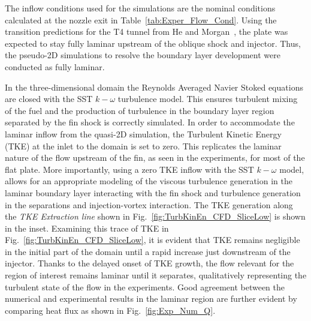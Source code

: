 \documentclass{AIAA}
\begin{document}
The inflow conditions used for the simulations are the nominal conditions calculated at the nozzle exit in Table~\ref{tab:Exper_Flow_Cond}.
Using the transition predictions for the T4 tunnel from He and Morgan~\cite{He_Morgan}, the plate was expected to stay fully laminar upstream of the oblique shock and injector.
Thus, the pseudo-2D simulations to resolve the boundary layer development were conducted as fully laminar.

In the three-dimensional domain the Reynolds Averaged Navier Stoked equations are closed with the SST $k-\omega$ turbulence model.
This ensures turbulent mixing of the fuel and the production of turbulence in the boundary layer region separated by the fin shock is correctly simulated.
In order to accommodate the laminar inflow from the quasi-2D simulation, the Turbulent Kinetic Energy (TKE) at the inlet to the domain is set to zero.
This replicates the laminar nature of the flow upstream of the fin, as seen in the experiments, for most of the flat plate.
More importantly, using a zero TKE inflow with the SST $k-\omega$ model, allows for an appropriate modeling of the viscous turbulence generation in the laminar boundary layer interacting with the fin shock and turbulence generation in the separations and injection-vortex interaction.
The TKE generation along the {\it TKE Extraction line} shown in Fig.~\ref{fig:TurbKinEn_CFD_SliceLow} is shown in the inset.
Examining this trace of TKE in Fig.~\ref{fig:TurbKinEn_CFD_SliceLow}, it is evident that TKE remains negligible in the initial part of the domain until a rapid increase just downstream of the injector.
Thanks to the delayed onset of TKE growth, the flow relevant for the region of interest remains laminar until it separates, qualitatively representing the turbulent state of the flow in the experiments.
Good agreement between the numerical and experimental results in the laminar region are further evident by comparing heat flux as shown in Fig.~\ref{fig:Exp_Num_Q}.
\end{document}
